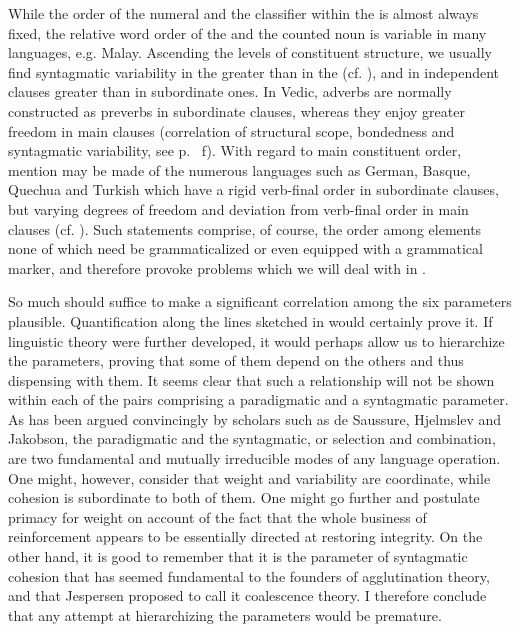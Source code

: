 \noindent While the order of the numeral and the classifier within the \lspcp is almost always fixed, the relative word order of the \lspcp and the counted noun is variable in many languages, e.g. Malay. Ascending the levels of constituent structure, we usually find syntagmatic variability in the \vp greater than in the \np (cf. \citealt[92f]{Givón1975}), and in independent clauses greater than in subordinate ones. In Vedic, adverbs are normally constructed as preverbs in subordinate clauses, whereas they enjoy greater freedom in main clauses (correlation of structural scope, bondedness and syntagmatic variability, see p.~\pageref{page106}%
f). With regard to main constituent order, mention may be made of the numerous languages such as German, Basque, Quechua and Turkish which have a rigid verb-final order in subordinate clauses, but varying degrees of freedom and deviation from verb-final order in main clauses (cf. \citealt{Ross1973}). Such statements comprise, of course, the order among elements none of which need be grammaticalized or even equipped with a grammatical marker, and therefore provoke problems which we will deal with in .


 


So much should suffice to make a significant correlation among the six parameters plausible. Quantification along the lines sketched in  would certainly prove it. If linguistic theory were further developed, it would perhaps allow us to hierarchize the parameters, proving that some of them depend on the others and thus dispensing with them. It seems clear that such a relationship will not be shown within each of the pairs comprising a paradigmatic and a syntagmatic parameter. As has been argued convincingly by scholars such as de Saussure, Hjelmslev and Jakobson, the paradigmatic and the syntagmatic, or selection and combination, are two fundamental and mutually irreducible modes of any language operation. One might, however, consider that weight and variability are coordinate, while cohesion is subordinate to both of them. One might go further and postulate primacy for weight on account of the fact that the whole business of reinforcement appears to be essentially directed at restoring integrity. On the other hand, it is good to remember that it is the parameter of syntagmatic cohesion that has seemed fundamental to the founders of agglutination theory, and that Jespersen proposed to call it coalescence theory. I therefore conclude that any attempt at hierarchizing the parameters would be premature.

